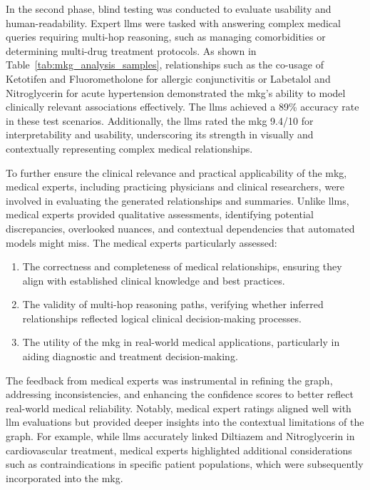 In the second phase, blind testing was conducted to evaluate usability and human-readability. Expert \glspl{llm} were tasked with answering complex medical queries requiring multi-hop reasoning, such as managing comorbidities or determining multi-drug treatment protocols. As shown in Table~\ref{tab:mkg_analysis_samples}, relationships such as the co-usage of Ketotifen and Fluorometholone for allergic conjunctivitis or Labetalol and Nitroglycerin for acute hypertension demonstrated the \gls{mkg}'s ability to model clinically relevant associations effectively. The \glspl{llm} achieved a 89\% accuracy rate in these test scenarios. Additionally, the \glspl{llm} rated the \gls{mkg} 9.4/10 for interpretability and usability, underscoring its strength in visually and contextually representing complex medical relationships.

To further ensure the clinical relevance and practical applicability of the \gls{mkg}, medical experts, including practicing physicians and clinical researchers, were involved in evaluating the generated relationships and summaries. Unlike \glspl{llm}, medical experts provided qualitative assessments, identifying potential discrepancies, overlooked nuances, and contextual dependencies that automated models might miss. The medical experts particularly assessed:
\begin{enumerate}
    \item The correctness and completeness of medical relationships, ensuring they align with established clinical knowledge and best practices.
    \item The validity of multi-hop reasoning paths, verifying whether inferred relationships reflected logical clinical decision-making processes.
    \item The utility of the \gls{mkg} in real-world medical applications, particularly in aiding diagnostic and treatment decision-making.
\end{enumerate}

The feedback from medical experts was instrumental in refining the graph, addressing inconsistencies, and enhancing the confidence scores to better reflect real-world medical reliability. Notably, medical expert ratings aligned well with \gls{llm} evaluations but provided deeper insights into the contextual limitations of the graph. For example, while \glspl{llm} accurately linked Diltiazem and Nitroglycerin in cardiovascular treatment, medical experts highlighted additional considerations such as contraindications in specific patient populations, which were subsequently incorporated into the \gls{mkg}.

